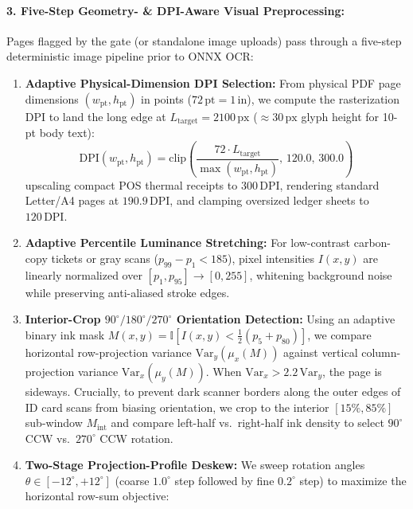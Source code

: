 \documentclass[10pt,twocolumn,letterpaper]{article}
\begin{document}
\paragraph{3. Five-Step Geometry- \& DPI-Aware Visual Preprocessing:}
Pages flagged by the gate (or standalone image uploads) pass through a five-step deterministic image pipeline prior to ONNX OCR:
\begin{enumerate}[leftmargin=1.4em,itemsep=1.5pt,topsep=2pt]
    \item \textbf{Adaptive Physical-Dimension DPI Selection:} From physical PDF page dimensions $(w_{\text{pt}}, h_{\text{pt}})$ in points ($72\,\text{pt} = 1\,\text{in}$), we compute the rasterization DPI to land the long edge at $L_{\text{target}} = 2100\,\text{px}$ ($\approx 30\,\text{px}$ glyph height for 10-pt body text):
    \begin{equation}
    \text{DPI}(w_{\text{pt}}, h_{\text{pt}}) = \text{clip}\!\left(\frac{72 \cdot L_{\text{target}}}{\max(w_{\text{pt}}, h_{\text{pt}})}, \, 120.0, \, 300.0\right)
    \end{equation}
    upscaling compact POS thermal receipts to $300\,\text{DPI}$, rendering standard Letter/A4 pages at $190.9\,\text{DPI}$, and clamping oversized ledger sheets to $120\,\text{DPI}$.
    \item \textbf{Adaptive Percentile Luminance Stretching:} For low-contrast carbon-copy tickets or gray scans ($p_{99} - p_1 < 185$), pixel intensities $I(x,y)$ are linearly normalized over $[p_1, p_{95}] \to [0, 255]$, whitening background noise while preserving anti-aliased stroke edges.
    \item \textbf{Interior-Crop $90^\circ/180^\circ/270^\circ$ Orientation Detection:} Using an adaptive binary ink mask $M(x,y) = \mathbb{I}[I(x,y) < \frac{1}{2}(p_5 + p_{80})]$, we compare horizontal row-projection variance $\text{Var}_y(\mu_x(M))$ against vertical column-projection variance $\text{Var}_x(\mu_y(M))$. When $\text{Var}_x > 2.2\,\text{Var}_y$, the page is sideways. Crucially, to prevent dark scanner borders along the outer edges of ID card scans from biasing orientation, we crop to the interior $[15\%, 85\%]$ sub-window $M_{\text{int}}$ and compare left-half vs.\ right-half ink density to select $90^\circ$ CCW vs.\ $270^\circ$ CCW rotation.
    \item \textbf{Two-Stage Projection-Profile Deskew:} We sweep rotation angles $\theta \in [-12^\circ, +12^\circ]$ (coarse $1.0^\circ$ step followed by fine $0.2^\circ$ step) to maximize the horizontal row-sum objective:
    \begin{equation}

\end{equation}
\end{enumerate}
\end{document}
